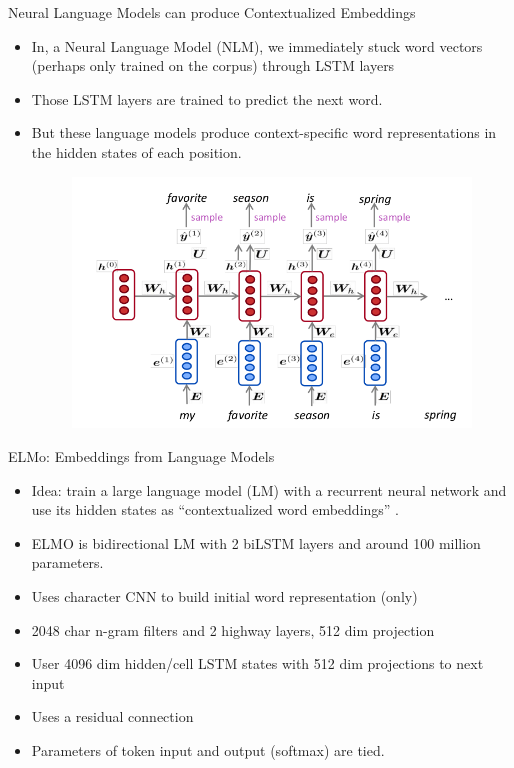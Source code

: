 \documentclass[handout]{beamer}
\begin{document}
\begin{frame}{Neural Language Models can produce Contextualized Embeddings}
\begin{scriptsize}
\begin{itemize}
\item In, a Neural Language Model (NLM), we immediately stuck word vectors (perhaps only trained on the corpus) through LSTM layers
\item  Those LSTM layers are trained to predict the next word.
\item  But these language models produce context-specific word representations in the hidden states of each position.

    \begin{figure}[h]
        	\includegraphics[scale = 0.4]{pics/lstm_nlm.png}
        \end{figure}  


\end{itemize}
\end{scriptsize}
\end{frame}




\begin{frame}{ELMo: Embeddings from Language Models}
\begin{scriptsize}
\begin{itemize}
\item Idea: train a large language model (LM)  with a recurrent neural network and use its hidden states as ``contextualized word embeddings'' 
\cite{peters-etal-2018-deep}. 

\item ELMO is bidirectional LM with 2 biLSTM layers and around 100 million parameters.
\item  Uses character CNN to build initial word representation (only)
\item  2048 char n-gram filters and 2 highway layers, 512 dim projection
\item  User 4096 dim hidden/cell LSTM states with 512 dim projections to next input
\item  Uses a residual connection
\item  Parameters of token input and output (softmax) are tied.


 

\end{itemize}
\end{scriptsize}
\end{frame}
\end{document}
